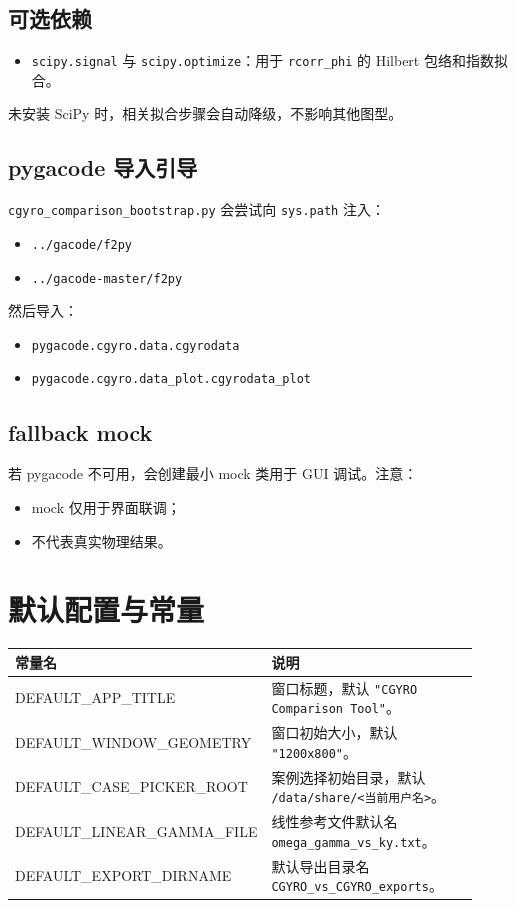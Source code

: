 \documentclass[11pt,a4paper]{ctexart}
\begin{document}
\subsection{可选依赖}
\begin{itemize}
  \item \texttt{scipy.signal} 与 \texttt{scipy.optimize}：用于 \texttt{rcorr\_phi} 的 Hilbert 包络和指数拟合。
\end{itemize}
未安装 SciPy 时，相关拟合步骤会自动降级，不影响其他图型。

\subsection{pygacode 导入引导}
\texttt{cgyro\_comparison\_bootstrap.py} 会尝试向 \texttt{sys.path} 注入：
\begin{itemize}
  \item \texttt{../gacode/f2py}
  \item \texttt{../gacode-master/f2py}
\end{itemize}
然后导入：
\begin{itemize}
  \item \texttt{pygacode.cgyro.data.cgyrodata}
  \item \texttt{pygacode.cgyro.data\_plot.cgyrodata\_plot}
\end{itemize}

\subsection{fallback mock}
若 pygacode 不可用，会创建最小 mock 类用于 GUI 调试。注意：
\begin{itemize}
  \item mock 仅用于界面联调；
  \item 不代表真实物理结果。
\end{itemize}

\section{默认配置与常量}
\begin{longtable}{>{\ttfamily}p{0.35\linewidth} p{0.57\linewidth}}
\toprule
常量名 & 说明 \\
\midrule
\endhead
DEFAULT\_APP\_TITLE & 窗口标题，默认 \texttt{"CGYRO Comparison Tool"}。 \\
DEFAULT\_WINDOW\_GEOMETRY & 窗口初始大小，默认 \texttt{"1200x800"}。 \\
DEFAULT\_CASE\_PICKER\_ROOT & 案例选择初始目录，默认 \texttt{/data/share/<当前用户名>}。 \\
DEFAULT\_LINEAR\_GAMMA\_FILE & 线性参考文件默认名 \texttt{omega\_gamma\_vs\_ky.txt}。 \\
DEFAULT\_EXPORT\_DIRNAME & 默认导出目录名 \texttt{CGYRO\_vs\_CGYRO\_exports}。 \\
\bottomrule
\end{longtable}
\end{document}

